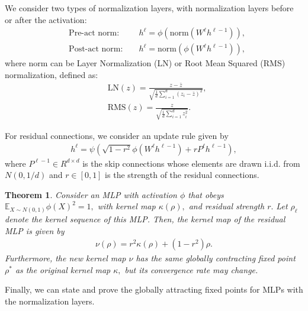 \documentclass[twoside]{article}
\newcommand{\E}{\mathbb{E}}
\newtheorem{theorem}{Theorem}
\theoremstyle{definition}
\begin{document}
We consider two types of normalization layers, with normalization layers before or after the activation: 
\begin{align*}
    & \text{Pre-act norm: } &&h^\ell = \phi\left(\text{norm}\left(W^\ell h^{\ell-1}\right)\right), \\
    & \text{Post-act norm: } &&h^\ell = \text{norm}\left(\phi\left(W^\ell h^{\ell-1}\right)\right), 
\end{align*}
where $\text{norm}$ can be Layer Normalization (LN) or Root Mean Squared (RMS) normalization, defined as:
\begin{align*}
    &\text{LN}(z) = \frac{z - \bar{z}}{\sqrt{\frac1d \sum_{i=1}^d (z_i - \bar{z})^2}}, \\
    &\text{RMS}(z) = \frac{z}{\sqrt{\frac1d \sum_{i=1}^d z_i^2}}.
\end{align*}

For residual connections, we consider an update rule given by 
\begin{align*}
    h^\ell = \psi(\sqrt{1-r^2} \phi(W^\ell h^{\ell-1}) + r P^{\ell} h^{\ell-1}), 
\end{align*}
where $P^{\ell-1}\in R^{d\times d}$ is the skip connections whose elements are drawn i.i.d. from $N(0,1/d)$ and $r\in [0,1]$ is the strength of the residual connections.  

\begin{theorem}
\label{thm:global_attract_res}
Consider an MLP with activation $\phi$ that obeys $\E_{X\sim N(0,1)} \phi(X)^2 = 1,$  with kernel map $\kappa(\rho),$ and residual strength $r.$ Let $\rho_\ell$ denote the kernel sequence of this MLP. Then, the kernel map of the residual MLP is given by 
\begin{align*}
    \nu(\rho) = r^2 \kappa(\rho) + (1-r^2) \rho.
\end{align*}
Furthermore, the new kernel map $\nu$ has the same globally contracting fixed point $\rho^*$ as the original kernel map $\kappa,$ but its convergence rate may change. 
\end{theorem}


Finally, we can state and prove the globally attracting fixed points for MLPs with the normalization layers.
\end{document}

